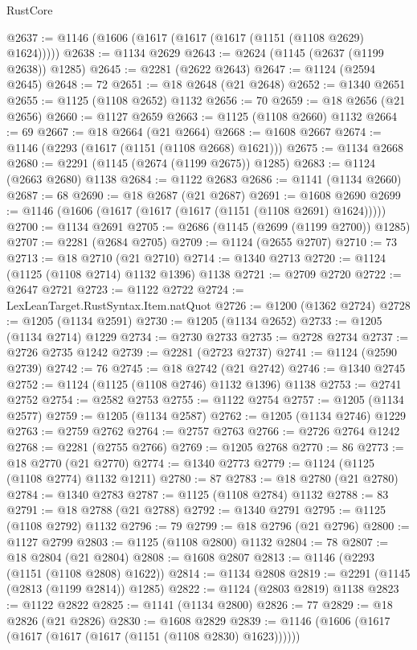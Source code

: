 \begin{lexlean}{RustCore}
\begin{coremodule}
@2637 := @1146 (@1606 (@1617 (@1617 (@1617 (@1151 (@1108 @2629) @1624)))))
@2638 := @1134 @2629
@2643 := @2624 (@1145 (@2637 (@1199 @2638)) @1285)
@2645 := @2281 (@2622 @2643)
@2647 := @1124 (@2594 @2645)
@2648 := 72
@2651 := @18 @2648 (@21 @2648)
@2652 := @1340 @2651
@2655 := @1125 (@1108 @2652) @1132
@2656 := 70
@2659 := @18 @2656 (@21 @2656)
@2660 := @1127 @2659
@2663 := @1125 (@1108 @2660) @1132
@2664 := 69
@2667 := @18 @2664 (@21 @2664)
@2668 := @1608 @2667
@2674 := @1146 (@2293 (@1617 (@1151 (@1108 @2668) @1621)))
@2675 := @1134 @2668
@2680 := @2291 (@1145 (@2674 (@1199 @2675)) @1285)
@2683 := @1124 (@2663 @2680) @1138
@2684 := @1122 @2683
@2686 := @1141 (@1134 @2660)
@2687 := 68
@2690 := @18 @2687 (@21 @2687)
@2691 := @1608 @2690
@2699 := @1146 (@1606 (@1617 (@1617 (@1617 (@1151 (@1108 @2691) @1624)))))
@2700 := @1134 @2691
@2705 := @2686 (@1145 (@2699 (@1199 @2700)) @1285)
@2707 := @2281 (@2684 @2705)
@2709 := @1124 (@2655 @2707)
@2710 := 73
@2713 := @18 @2710 (@21 @2710)
@2714 := @1340 @2713
@2720 := @1124 (@1125 (@1108 @2714) @1132 @1396) @1138
@2721 := @2709 @2720
@2722 := @2647 @2721
@2723 := @1122 @2722
@2724 := LexLeanTarget.RustSyntax.Item.natQuot
@2726 := @1200 (@1362 @2724)
@2728 := @1205 (@1134 @2591)
@2730 := @1205 (@1134 @2652)
@2733 := @1205 (@1134 @2714) @1229
@2734 := @2730 @2733
@2735 := @2728 @2734
@2737 := @2726 @2735 @1242
@2739 := @2281 (@2723 @2737)
@2741 := @1124 (@2590 @2739)
@2742 := 76
@2745 := @18 @2742 (@21 @2742)
@2746 := @1340 @2745
@2752 := @1124 (@1125 (@1108 @2746) @1132 @1396) @1138
@2753 := @2741 @2752
@2754 := @2582 @2753
@2755 := @1122 @2754
@2757 := @1205 (@1134 @2577)
@2759 := @1205 (@1134 @2587)
@2762 := @1205 (@1134 @2746) @1229
@2763 := @2759 @2762
@2764 := @2757 @2763
@2766 := @2726 @2764 @1242
@2768 := @2281 (@2755 @2766)
@2769 := @1205 @2768
@2770 := 86
@2773 := @18 @2770 (@21 @2770)
@2774 := @1340 @2773
@2779 := @1124 (@1125 (@1108 @2774) @1132 @1211)
@2780 := 87
@2783 := @18 @2780 (@21 @2780)
@2784 := @1340 @2783
@2787 := @1125 (@1108 @2784) @1132
@2788 := 83
@2791 := @18 @2788 (@21 @2788)
@2792 := @1340 @2791
@2795 := @1125 (@1108 @2792) @1132
@2796 := 79
@2799 := @18 @2796 (@21 @2796)
@2800 := @1127 @2799
@2803 := @1125 (@1108 @2800) @1132
@2804 := 78
@2807 := @18 @2804 (@21 @2804)
@2808 := @1608 @2807
@2813 := @1146 (@2293 (@1151 (@1108 @2808) @1622))
@2814 := @1134 @2808
@2819 := @2291 (@1145 (@2813 (@1199 @2814)) @1285)
@2822 := @1124 (@2803 @2819) @1138
@2823 := @1122 @2822
@2825 := @1141 (@1134 @2800)
@2826 := 77
@2829 := @18 @2826 (@21 @2826)
@2830 := @1608 @2829
@2839 := @1146 (@1606 (@1617 (@1617 (@1617 (@1617 (@1151 (@1108 @2830) @1623))))))

\end{coremodule}
\end{lexlean}
